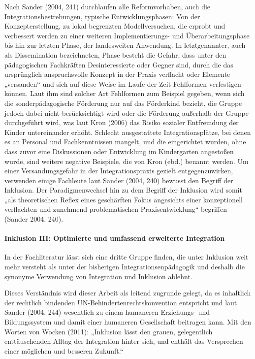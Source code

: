 Nach Sander (2004, 241) durchlaufen alle Reformvorhaben, auch die Integrationsbestrebungen, typische Entwicklungsphasen: Von der Konzepterstellung, zu lokal begrenzten Modellversuchen, die erprobt und verbessert werden zu einer weiteren Implementierungs- und Überarbeitungsphase bis hin zur letzten Phase, der landesweiten Anwendung. In letztgenannter, auch als Dissemination bezeichneten, Phase besteht die Gefahr, dass unter den pädagogischen Fachkräften Desinteressierte oder Gegner sind, durch die das ursprünglich anspruchsvolle Konzept in der Praxis verflacht oder Elemente „versanden“ und sich auf diese Weise im Laufe der Zeit Fehlformen verfestigen können. Laut ihm sind solcher Art Fehlformen zum Beispiel gegeben, wenn sich die  sonderpädagogische Förderung nur auf das Förderkind bezieht, die Gruppe jedoch dabei nicht berücksichtigt wird oder die Förderung außerhalb der Gruppe durchgeführt wird, was laut Kron (2006) das Risiko sozialer Entfremdung der Kinder untereinander erhöht. Schlecht ausgestattete Integrationsplätze, bei denen es an Personal und Fachkenntnissen mangelt, und die eingerichtet wurden, ohne dass zuvor eine Diskussionen oder Entwicklung im Kindergarten angestoßen wurde, sind weitere negative Beispiele, die von Kron (ebd.) benannt werden. Um einer Versandungsgefahr in der Integrationspraxis gezielt entgegenzuwirken, verwenden einige Fachleute laut Sander (2004, 240) bewusst den Begriff der Inklusion. Der Paradigmenwechsel hin zu dem Begriff der Inklusion wird somit „als theoretischen Reflex eines geschärften Fokus angesichts einer konzeptionell verflachten und zunehmend problematischen Praxisentwicklung“ begriffen (Sander 2004, 240). 

\paragraph{Inklusion III: Optimierte und umfassend erweiterte Integration}

In der Fachliteratur lässt sich eine dritte Gruppe finden, die unter Inklusion weit mehr versteht als unter der bisherigen Integrationsenpädagogik und deshalb die synonyme Verwendung von Integration und Inklusion ablehnt. 

Dieses Verständnis wird dieser Arbeit als leitend zugrunde gelegt, da es inhaltlich der rechtlich bindenden UN-Behindertenrechtskonvention entspricht und laut Sander (2004, 244) wesentlich zu einem humaneren Erziehungs- und Bildungssystem und damit einer humaneren Gesellschaft beitragen kann. Mit den Worten von Wocken (2011): „Inklusion lässt den grauen, gelegentlich enttäuschenden Alltag der Integration hinter sich, und enthält das Versprechen einer möglichen und besseren Zukunft.“ 

